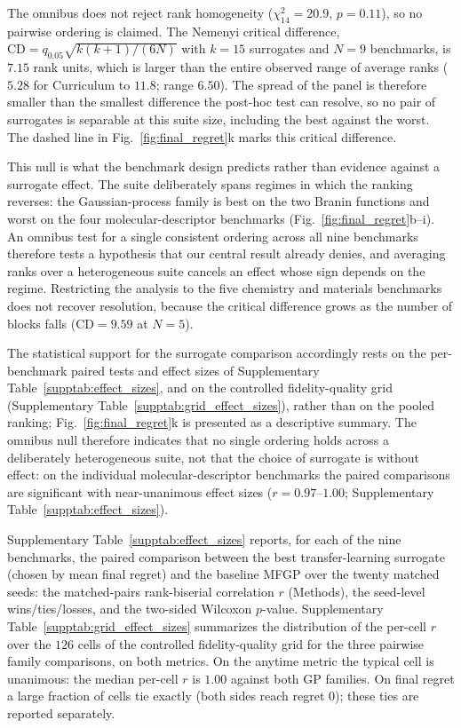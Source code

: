 \documentclass[11pt,a4paper]{article}%
\begin{document}
The omnibus does not reject rank homogeneity ($\chi^2_{14} = 20.9$, $p = 0.11$), so no
pairwise ordering is claimed. The Nemenyi critical difference,
$\mathrm{CD} = q_{0.05}\sqrt{k(k+1)/(6N)}$ with $k = 15$ surrogates and $N = 9$
benchmarks, is $7.15$ rank units, which is larger than the entire observed range of
average ranks ($5.28$ for Curriculum to $11.8$; range $6.50$). The spread of the panel
is therefore smaller than the smallest difference the post-hoc test can resolve, so no
pair of surrogates is separable at this suite size, including the best against the
worst. The dashed line in Fig.~\ref{fig:final_regret}k marks this critical difference.

This null is what the benchmark design predicts rather than evidence against a
surrogate effect. The suite deliberately spans regimes in which the ranking reverses:
the Gaussian-process family is best on the two Branin functions and worst on the four
molecular-descriptor benchmarks (Fig.~\ref{fig:final_regret}b--i). An omnibus test for
a single consistent ordering across all nine benchmarks therefore tests a hypothesis
that our central result already denies, and averaging ranks over a heterogeneous suite
cancels an effect whose sign depends on the regime. Restricting the analysis to the
five chemistry and materials benchmarks does not recover resolution, because the
critical difference grows as the number of blocks falls ($\mathrm{CD} = 9.59$ at
$N = 5$).

The statistical support for the surrogate comparison accordingly rests on the
per-benchmark paired tests and effect sizes of Supplementary
Table~\ref{supptab:effect_sizes}, and on the controlled fidelity-quality grid
(Supplementary Table~\ref{supptab:grid_effect_sizes}), rather than on the pooled
ranking; Fig.~\ref{fig:final_regret}k is presented as a descriptive summary. The
omnibus null therefore indicates that no single ordering holds across a deliberately
heterogeneous suite, not that the choice of surrogate is without effect: on the
individual molecular-descriptor benchmarks the paired comparisons are significant with
near-unanimous effect sizes ($r = 0.97$--$1.00$; Supplementary
Table~\ref{supptab:effect_sizes}).


Supplementary Table~\ref{supptab:effect_sizes} reports, for each of the nine
benchmarks, the paired comparison between the best transfer-learning surrogate
(chosen by mean final regret) and the baseline MFGP over the twenty matched seeds:
the matched-pairs rank-biserial correlation $r$ (Methods), the seed-level
wins/ties/losses, and the two-sided Wilcoxon $p$-value. Supplementary
Table~\ref{supptab:grid_effect_sizes} summarizes the distribution of the per-cell
$r$ over the $126$ cells of the controlled fidelity-quality grid for the three
pairwise family comparisons, on both metrics. On the anytime metric the typical
cell is unanimous: the median per-cell $r$ is $1.00$ against both GP families. On
final regret a large fraction of cells tie exactly (both sides reach regret $0$);
these ties are reported separately.
\end{document}
